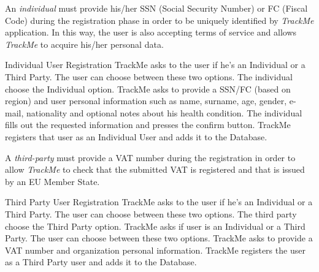 \documentclass[a4paper]{article}
\begin{document}
        An \textit{individual} must provide his/her SSN (Social Security Number) or FC (Fiscal Code) during the registration phase in order to be uniquely identified by \textit{TrackMe} application. In this way, the user is also accepting terms of service and allows \textit{TrackMe} to acquire his/her personal data.
        \begin{usecase}{Individual User Registration}
              {TrackMe asks to the user if he's an Individual or a Third Party. The user can choose between these two options.}
              {The individual choose the Individual option.}
              {TrackMe asks to provide a SSN/FC (based on region) and user personal information such as name, surname, age, gender, e-mail, nationality and optional notes about his health condition.}
              {The individual fills out the requested information and presses the confirm button.}
              {TrackMe registers that user as an Individual User and adds it to the  Database.}
        \end{usecase}
        
        A \textit{third-party} must provide a VAT number during the registration in order to allow \textit{TrackMe} to check that the submitted VAT is registered and that is issued by an EU Member State.
        
        \begin{usecase}{Third Party User Registration}
              {TrackMe asks to the user if he's an Individual or a Third Party. The user can choose between these two options.}
              {The third party choose the Third Party option.}
              {TrackMe asks if user is an Individual or a Third Party. The user can choose between these two options.}
              {TrackMe asks to provide a VAT number and organization personal information.}
              {TrackMe registers the user as a Third Party user and adds it to the Database.}
        \end{usecase}
        
\end{document}
